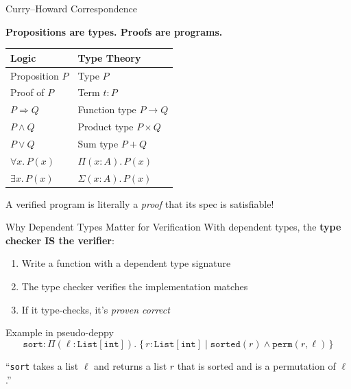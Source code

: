 \documentclass[aspectratio=169,11pt]{beamer}
\begin{document}
\begin{frame}{Curry--Howard Correspondence}
\begin{center}
\Large \textbf{Propositions are types. Proofs are programs.}
\end{center}

\vspace{1em}
\begin{center}
\begin{tabular}{ll}
\toprule
\textbf{Logic} & \textbf{Type Theory} \\
\midrule
Proposition $P$ & Type $P$ \\
Proof of $P$ & Term $t : P$ \\
$P \Rightarrow Q$ & Function type $P \to Q$ \\
$P \land Q$ & Product type $P \times Q$ \\
$P \lor Q$ & Sum type $P + Q$ \\
$\forall x.\, P(x)$ & $\Pi(x : A).\, P(x)$ \\
$\exists x.\, P(x)$ & $\Sigma(x : A).\, P(x)$ \\
\bottomrule
\end{tabular}
\end{center}

\vspace{0.5em}
A verified program is literally a \emph{proof} that its spec is satisfiable!
\end{frame}

\begin{frame}{Why Dependent Types Matter for Verification}
With dependent types, the \textbf{type checker IS the verifier}:

\vspace{0.5em}
\begin{enumerate}
\item Write a function with a dependent type signature
\item The type checker verifies the implementation matches
\item If it type-checks, it's \emph{proven correct}
\end{enumerate}

\vspace{0.5em}
\begin{block}{Example in pseudo-deppy}
\vspace{-0.5em}
\[
  \mathtt{sort} : \Pi(\ell : \mathtt{List}[\mathtt{int}]).\;
  \{\, r : \mathtt{List}[\mathtt{int}] \mid
  \mathtt{sorted}(r) \land \mathtt{perm}(r, \ell) \,\}
\]
\vspace{-0.5em}

``\texttt{sort} takes a list $\ell$ and returns a list $r$ that is
sorted and is a permutation of $\ell$.''
\end{block}
\end{frame}
\end{document}
